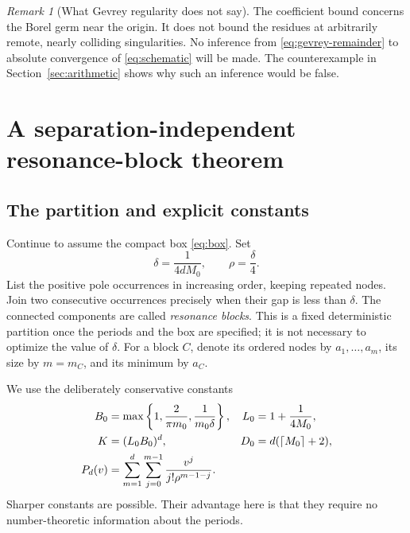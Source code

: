 \documentclass[11pt,a4paper]{article}
\numberwithin{equation}{section}
\theoremstyle{definition}
\theoremstyle{remark}
\newtheorem{remark}[theorem]{Remark}
\begin{document}
\begin{remark}[What Gevrey regularity does not say]
The coefficient bound concerns the Borel germ near the origin. It does not
bound the residues at arbitrarily remote, nearly colliding singularities.
No inference from \eqref{eq:gevrey-remainder} to absolute convergence of
\eqref{eq:schematic} will be made. The counterexample in
Section~\ref{sec:arithmetic} shows why such an inference would be false.
\end{remark}

\section{A separation-independent resonance-block theorem}
\label{sec:blocks}

\subsection{The partition and explicit constants}
Continue to assume the compact box \eqref{eq:box}. Set
\begin{equation}
 \delta=\frac1{4dM_0},\qquad \rho=\frac\delta4.
 \label{eq:delta}
\end{equation}
List the positive pole occurrences in increasing order, keeping repeated
nodes. Join two consecutive occurrences precisely when their gap is less
than $\delta$. The connected components are called \emph{resonance
blocks}. This is a fixed deterministic partition once the periods and the
box are specified; it is not necessary to optimize the value of $\delta$.
For a block $C$, denote its ordered nodes by $a_1,\ldots,a_m$, its size by
$m=m_C$, and its minimum by $a_C$.

We use the deliberately conservative constants
\begin{align}
 B_0&=\max\left\{1,\frac2{\pi m_0},\frac1{m_0\delta}\right\},
 &L_0&=1+\frac1{4M_0},\notag\\
 K&=(L_0B_0)^d,
 &D_0&=d(\lceil M_0\rceil+2),\label{eq:constants}\\
 P_d(v)&=\sum_{m=1}^{d}\sum_{j=0}^{m-1}
          \frac{v^j}{j!\rho^{m-1-j}}.\notag
\end{align}
Sharper constants are possible. Their advantage here is that they require
no number-theoretic information about the periods.
\end{document}
